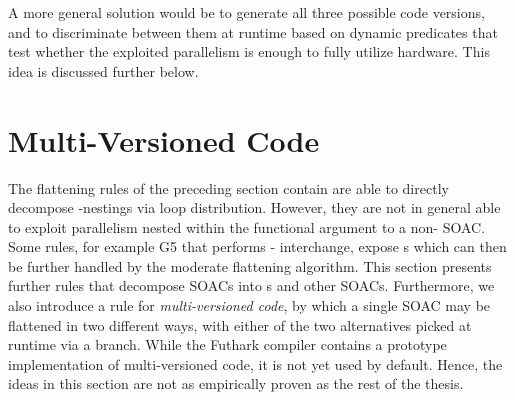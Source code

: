 A more general solution would be to generate all three possible code
versions, and to discriminate between them at runtime based on dynamic
predicates that test whether the exploited parallelism is enough to
fully utilize hardware.  This idea is discussed further below.

\section{Multi-Versioned Code}
\label{sec:multi-versioned-code}

The flattening rules of the preceding section contain are able to
directly decompose -nestings via loop distribution.  However,
they are not in general able to exploit parallelism nested within the
functional argument to a non- SOAC.  Some rules, for example
G5 that performs - interchange, expose s
which can then be further handled by the moderate flattening
algorithm.  This section presents further rules that decompose SOACs
into s and other SOACs.  Furthermore, we also introduce a rule
for \textit{multi-versioned code}, by which a single SOAC may be
flattened in two different ways, with either of the two alternatives
picked at runtime via a branch.  While the Futhark compiler contains a
prototype implementation of multi-versioned code, it is not yet used
by default.  Hence, the ideas in this section are not as empirically
proven as the rest of the thesis.


